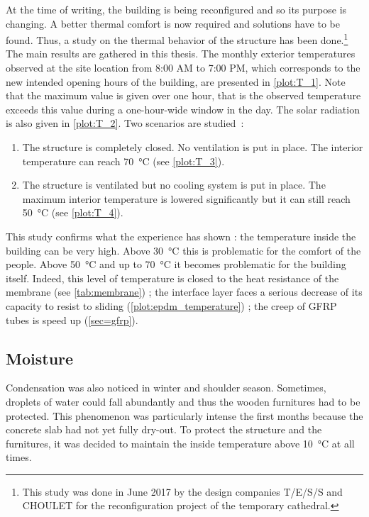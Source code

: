 At the time of writing, the building is being reconfigured and so its purpose is changing. A better thermal comfort is now required and solutions have to be found. Thus, a study on the thermal behavior of the structure has been done.\footnote{This study was done in June 2017 by the design companies T/E/S/S and CHOULET for the reconfiguration project of the temporary cathedral.} The main results are gathered in this thesis. The monthly exterior temperatures observed at the site location from 8:00 AM to 7:00 PM, which corresponds to the new intended opening hours of the building, are presented in \cref{plot:T_1}. Note that the maximum value is given over one hour, that is the observed temperature exceeds this value during a one-hour-wide window in the day. The solar radiation is also given in \cref{plot:T_2}. Two scenarios are studied~:
\begin{enumerate}
\item The structure is completely closed. No ventilation is put in place. The interior temperature can reach \SI{70}{\celsius} (see \cref{plot:T_3}).
\item The structure is ventilated but no cooling system is put in place. The maximum interior temperature is lowered significantly but it can still reach \SI{50}{\celsius} (see \cref{plot:T_4}).
\end{enumerate}

This study confirms what the experience has shown : the temperature inside the building can be very high. Above \SI{30}{\celsius} this is problematic for the comfort of the people. Above \SI{50}{\celsius} and up to \SI{70}{\celsius} it becomes problematic for the building itself. Indeed, this level of temperature is closed to the heat resistance of the membrane (see \cref{tab:membrane}) ; the interface layer faces a serious decrease of its capacity to resist to sliding (\cref{plot:epdm_temperature}) ; the creep of GFRP tubes is speed up (\cref{sec=gfrp}).

\subsection{Moisture}
Condensation was also noticed in winter and shoulder season. Sometimes, droplets of water could fall abundantly and thus the wooden furnitures had to be protected. This phenomenon was particularly intense the first months because the concrete slab had not yet fully dry-out. To protect the structure and the furnitures, it was decided to maintain the inside temperature above \SI{10}{\celsius} at all times.


